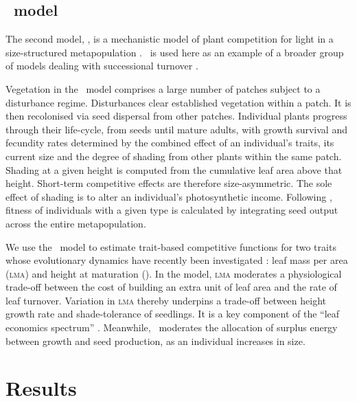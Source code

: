 \documentclass[a4paper,11pt]{article}
\begin{document}
\subsection{\plant\ model}

The second model, \plant, is a mechanistic model of plant competition
for light in a size-structured metapopulation \citep{Falster-2011,
  Falster-2015}. \plant\ is used here as an example of a broader group
of models dealing with successional turnover
\citep{Huston-1987,Kohyama-1993,Moorcroft-2001,Falster-2011}.

Vegetation in the \plant\ model comprises a large number of patches subject
to a disturbance regime.  Disturbances clear established
vegetation within a patch. It is then recolonised via seed
dispersal from other patches.  Individual plants progress through
their life-cycle, from seeds until mature adults, with growth survival
and fecundity rates determined by the combined effect of an
individual's traits, its current size and the degree of shading from
other plants within the same patch. Shading at a given
height is computed from the cumulative leaf area above that height. Short-term competitive effects are therefore size-asymmetric. The sole
effect of shading is to alter an individual's photosynthetic
income. Following \citep{Falster-2015}, fitness of individuals
with a given type is calculated by integrating seed output across the
entire metapopulation.

We use the \plant\ model to estimate trait-based competitive functions
for two traits whose evolutionary dynamics have recently been
investigated \citep{Falster-2015}: leaf mass per area (\textsc{lma})
and height at maturation (\hmat). In the model, \textsc{lma} moderates
a physiological trade-off between the cost of building an extra unit
of leaf area and the rate of leaf turnover.  Variation in \textsc{lma}
thereby underpins a trade-off between height growth rate and
shade-tolerance of seedlings. It is a key component of the
``leaf economics spectrum'' \citep{Wright-2004}. Meanwhile, \hmat\
moderates the allocation of surplus energy between growth and seed
production, as an individual increases in size.


\section{Results}
\end{document}
